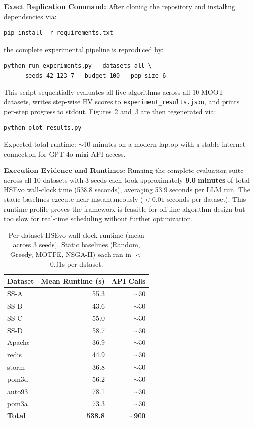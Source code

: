 \documentclass[sigconf,nonacm]{acmart}
\begin{document}
\textbf{Exact Replication Command:} After cloning the
repository and installing dependencies via:
\begin{verbatim}
pip install -r requirements.txt
\end{verbatim}
the complete experimental pipeline is reproduced by:
\begin{verbatim}
python run_experiments.py --datasets all \
    --seeds 42 123 7 --budget 100 --pop_size 6
\end{verbatim}
This script sequentially evaluates all five algorithms
across all 10 MOOT datasets, writes step-wise HV scores
to \texttt{experiment\_results.json}, and prints
per-step progress to stdout. Figures~2 and~3 are then
regenerated via:
\begin{verbatim}
python plot_results.py
\end{verbatim}
Expected total runtime: $\sim$10 minutes on a modern
laptop with a stable internet connection for GPT-4o-mini
API access.

\textbf{Execution Evidence and Runtimes:} Running the complete evaluation suite across all 10 datasets with 3 seeds each took approximately \textbf{9.0 minutes} of total HSEvo wall-clock time (538.8 seconds), averaging 53.9 seconds per LLM run. The static baselines execute near-instantaneously ($<0.01$ seconds per dataset). This runtime profile proves the framework is feasible for off-line algorithm design but too slow for real-time scheduling without further optimization.

\begin{table}[h]
\caption{Per-dataset HSEvo wall-clock runtime (mean across 3
seeds). Static baselines (Random, Greedy, MOTPE, NSGA-II)
each ran in $<$0.01s per dataset.}
\label{tab:runtimes}
\small
\begin{tabular}{lrr}
\toprule
\textbf{Dataset} & \textbf{Mean Runtime (s)} &
\textbf{API Calls} \\
\midrule
SS-A    & 55.3 & $\sim$30 \\
SS-B    & 43.6 & $\sim$30 \\
SS-C    & 55.0 & $\sim$30 \\
SS-D    & 58.7 & $\sim$30 \\
Apache  & 36.9 & $\sim$30 \\
redis   & 44.9 & $\sim$30 \\
storm   & 36.8 & $\sim$30 \\
pom3d   & 56.2 & $\sim$30 \\
auto93  & 78.1 & $\sim$30 \\
pom3a   & 73.3 & $\sim$30 \\
\midrule
\textbf{Total} & \textbf{538.8} & \textbf{$\sim$900} \\
\bottomrule
\end{tabular}
\end{table}
\end{document}
